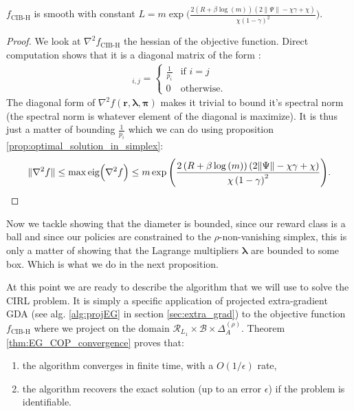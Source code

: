 \begin{proposition}
    \label{prop:f_eg_cop_smooth} $f_\text{CIB-H}$ is smooth with constant $L = m \exp \Big(\frac{2\left(R + \beta \log{\left(m \right)}\right) \left(2  \|\Psi\| - \chi \gamma + \chi\right)}{\chi \left(1- \gamma\right)^{2}} \Big)$.
\end{proposition}

\begin{proof}
    We look at $\nabla^2 f_\text{CIB-H}$ the hessian of the objective function. Direct computation shows that it is a diagonal matrix of the form :
    \begin{align*}
        [\nabla^2 f(\bm{r},\bm{\lambda},\bm{\pi})]_{i,j} = \begin{cases}
            \frac{1}{p_i} & \text{if } i=j\\
            0 & \text{otherwise}.
        \end{cases}
    \end{align*}
    The diagonal form of $\nabla^2 f(\bm{r},\bm
    {\lambda},\bm{\pi})$ makes it trivial to bound it's spectral norm (the spectral norm is whatever element of the diagonal is maximize). It is thus just a matter of bounding $\frac{1}{p_i}$ which we can do using proposition \ref{prop:optimal_solution_in_simplex}:
    \begin{align*}
        \| \nabla^2 f \| \leq \max \text{eig} \Bigl( \nabla^2 f \Bigr) \leq m \exp \Bigg(\frac{2\left(R + \beta \log{\left(m \right)}\right) \left(2  \|\Psi\| - \chi \gamma + \chi\right)}{\chi \left(1- \gamma\right)^{2}} \Bigg).
    \end{align*}
\end{proof}

Now we tackle showing that the diameter is bounded, since our reward class is a ball and since our policies are constrained to the $\rho$-non-vanishing simplex, this is only a matter of showing that the Lagrange multipliers $\bm{\lambda}$ are bounded to some box. Which is what we do in the next proposition.

At this point we are ready to describe the algorithm that we will use to solve the CIRL problem. It is simply a specific application of projected extra-gradient GDA (see alg. \ref{alg:projEG} in section \ref{sec:extra_grad}) to the objective function $f_\text{CIB-H}$ where we project on the domain $\mathcal{R}_{L_1}\times \mathcal{B} \times \Delta_A^{(\rho)}$. Theorem \ref{thm:EG_COP_convergence} proves that:
\begin{enumerate}
    \item the algorithm converges in finite time, with a $O(1/\epsilon)$ rate,
    \item the algorithm recovers the exact solution (up to an error $\epsilon$) if the problem is identifiable.
\end{enumerate}

